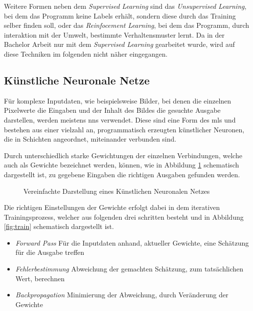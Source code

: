 Weitere Formen neben dem \textit{Supervised Learning} sind das 
\textit{Unsupervised Learning}, bei dem das Programm keine Labels 
erhält, sondern diese durch das Training selber finden 
soll, oder das \textit{Reinfocement Learning}, bei dem das Programm, 
durch interaktion mit der Umwelt, bestimmte Verhaltensmuster lernt.
Da in der Bachelor Arbeit nur mit dem \textit{Supervised Learning} 
gearbeitet wurde, wird auf diese Techniken im folgenden nicht 
näher eingegangen.


\subsection{Künstliche Neuronale Netze} \label{subsec:nn}

Für komplexe Inputdaten, wie beispielsweise Bilder, bei denen 
die einzelnen Pixelwerte die Eingaben und der Inhalt des Bildes die 
gesuchte Ausgabe darstellen, werden meistens \Glspl{nn} verwendet.
Diese sind eine Form des \Glspl{ml} und bestehen aus einer 
vielzahl an, programmatisch erzeugten künstlicher Neuronen, die 
in Schichten angeordnet, miteinander verbunden sind.

Durch unterschiedlich starke Gewichtungen der einzelnen
Verbindungen, welche auch als Gewichte bezeichnet werden, 
können, wie in Abbildung \ref{fig:nn} schematisch dargestellt ist,
zu gegebene Eingaben die richtigen Ausgaben gefunden werden.

\vspace{1cm}
\begin{figure}[H]
    \centering
    \def\svgwidth{0.85\columnwidth}
    
    \caption{Vereinfachte Darstellung eines Künstlichen 
    Neuronalen Netzes}
    \label{fig:nn}
\end{figure}
\vspace{1cm}

Die richtigen Einstellungen der Gewichte erfolgt dabei
in dem iterativen Trainingsprozess, welcher aus folgenden 
drei schritten besteht und in Abbildung \ref{fig:train}
schematisch dargestellt ist.

\begin{itemize}
    \item \textit{Forward Pass} Für die Inputdaten anhand,
            aktueller Gewichte, eine Schätzung für die Ausgabe treffen
    \item \textit{Fehlerbestimmung} Abweichung der gemachten Schätzung,
             zum tatsächlichen Wert, berechnen
    \item \textit{Backpropagation} Minimierung der
            Abweichung, durch Veränderung der Gewichte
\end{itemize}

